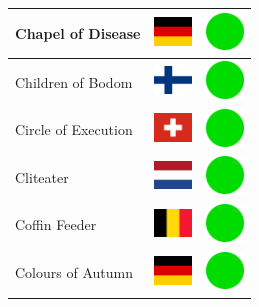 \documentclass[12pt, a4paper, twoside]{report}
\begin{document}
\begin{center}
\begin{longtable}{|p{5cm}|p{2cm}|p{2cm}|}
Chapel of Disease & \includegraphics[width=1cm]{4x3/de} & \includegraphics[width=1cm]{likes/y} \\ \hline
Children of Bodom & \includegraphics[width=1cm]{4x3/fi} & \includegraphics[width=1cm]{likes/y} \\ \hline
Circle of Execution & \includegraphics[width=1cm]{4x3/ch} & \includegraphics[width=1cm]{likes/y} \\ \hline
Cliteater & \includegraphics[width=1cm]{4x3/nl} & \includegraphics[width=1cm]{likes/y} \\ \hline
Coffin Feeder & \includegraphics[width=1cm]{4x3/be} & \includegraphics[width=1cm]{likes/y} \\ \hline
Colours of Autumn & \includegraphics[width=1cm]{4x3/de} & \includegraphics[width=1cm]{likes/y} \\ \hline

\end{longtable}
\end{center}
\end{document}
